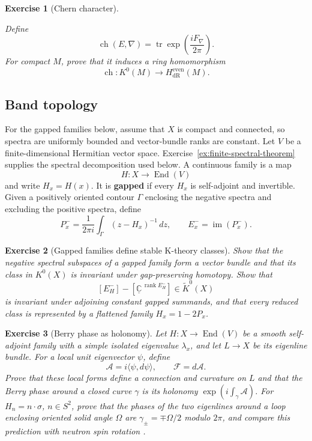 \documentclass{article}
\newtheorem{exercise}{Exercise}
\newcommand{\End}{\operatorname{End}}
\begin{document}
\begin{exercise}[Chern character]\label{ex:chern-character}\leavevmode\par
\textit{Define}
\[
\operatorname{ch}(E,\nabla)
=\operatorname{tr}\exp\left(\frac{iF_\nabla}{2\pi}\right).
\]
\textit{For compact $M$, prove that it induces a ring homomorphism}
\[
\operatorname{ch}:K^0(M)\longrightarrow H_{\mathrm{dR}}^{\mathrm{even}}(M).
\]
\end{exercise}

\subsection{Band topology}

For the gapped families below, assume that $X$ is compact and connected, so
spectra are uniformly bounded and vector-bundle ranks are constant. Let $V$
be a finite-dimensional Hermitian vector space.
Exercise~\ref{ex:finite-spectral-theorem} supplies the spectral decomposition
used below. A continuous family is a map
\[
H:X\longrightarrow\End(V)
\]
and write $H_x=H(x)$. It is \textbf{gapped} if every $H_x$ is self-adjoint and invertible. Given a positively oriented contour $\Gamma$ enclosing the negative spectra and excluding the positive spectra, define
\[
P_x^-=\frac{1}{2\pi i}\int_\Gamma(z-H_x)^{-1}\,dz,
\qquad
E_x^-=\operatorname{im}(P_x^-).
\]

\begin{exercise}[Gapped families define stable K-theory classes]\leavevmode\par
\textit{Show that the negative spectral subspaces of a gapped family form a
vector bundle and that its class in $K^0(X)$ is invariant under
gap-preserving homotopy. Show that}
\[
[E_H^-]-[\underline{\mathbb C}^{\,\operatorname{rank}E_H^-}]
\in\widetilde K^0(X)
\]
\textit{is invariant under adjoining constant gapped summands, and that every
reduced class is represented by a flattened family $H_x=1-2P_x$.}
\end{exercise}

\begin{exercise}[Berry phase as holonomy]\leavevmode\par
\textit{Let $H:X\to\End(V)$ be a smooth self-adjoint family with a simple
isolated eigenvalue $\lambda_x$, and let $L\to X$ be its eigenline bundle.
For a local unit eigenvector $\psi$, define}
\[
\mathcal A=i\langle\psi,d\psi\rangle,
\qquad
\mathcal F=d\mathcal A.
\]
\textit{Prove that these local forms define a connection and curvature on
$L$ and that the Berry phase around a closed curve $\gamma$ is its holonomy
$\exp(i\int_\gamma\mathcal A)$. For $H_n=n\cdot\sigma$, $n\in S^2$, prove
that the phases of the two eigenlines around a loop enclosing oriented solid
angle $\Omega$ are $\gamma_\pm=\mp\Omega/2$ modulo $2\pi$, and compare this
prediction with neutron spin rotation \cite{bitter-dubbers}.}
\end{exercise}
\end{document}
